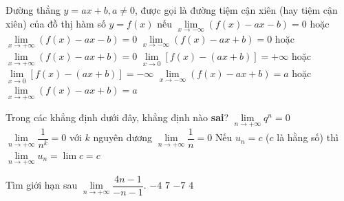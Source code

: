 \begin{ex}%
	Đường thẳng $y = ax + b, a \neq 0$, được  gọi là đường tiệm cận xiên (hay tiệm cận xiên) của đồ thị hàm số $y = f(x)$ nếu
	\choice 
		{\True $\lim\limits_{x\to -\infty }(f(x)-ax-b)=0$ hoặc $\lim\limits_{x\to +\infty }(f(x)-ax-b)=0$} 
		 {$\lim\limits_{x\to -\infty }(f(x)-ax+b)=0$ hoặc $\lim\limits_{x\to +\infty }(f(x)-ax+b)=0$}
		{$\lim\limits_{x\to 0  }[f(x)-(ax+b)]=+\infty $ hoặc $\lim\limits_{x\to 0 }[f(x)-(ax+b)]=-\infty $}
		{$\lim\limits_{x\to -\infty }(f(x)-ax+b)=a$  hoặc $\lim\limits_{x\to +\infty }(f(x)-ax+b)=a$}
\end{ex}

\begin{ex}%
	Trong các khẳng định dưới đây, khẳng định nào \textbf{sai}? 
	 \choice
		 {\True $\lim\limits_{n \to +\infty} q^n=0$}
		{$\lim\limits_{n \to +\infty} \dfrac{1}{n^k}=0$ với $k$  nguyên dương}
		 {$\lim\limits_{n \to +\infty} \dfrac{1}{n}=0$}
		{Nếu $u_n=c$ ($c$ là hằng số) thì $\lim\limits_{n \to +\infty} u_n=\lim c=c$} 
\end{ex}

\begin{ex}%
	Tìm giới hạn sau  $\lim\limits_{n \to +\infty} \dfrac{4n -1}{-n -1}$.
	 \choice
		 {\True $-4$}
		{$7$} 
		{$-7$} 
		 {$4$}
\end{ex}

